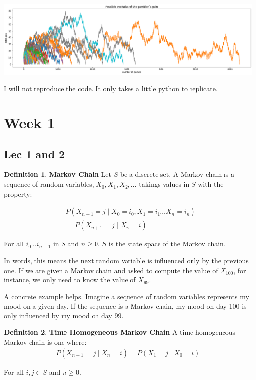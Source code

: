 \documentclass[12pt]{article}
\theoremstyle{definition}
\newtheorem{definition}{Definition}[section]
\begin{document}
\begin{center}
\includegraphics[scale = .35]{index.png}
\end{center}

I will not reproduce the code. It only takes a little python to replicate.


\section{Week 1}
\subsection{Lec 1 and 2}


\begin{definition}{\textbf{Markov Chain}}
Let $S$ be a discrete set. A Markov chain is a sequence of random variables, $X_0, X_1, X_2, \dots$ takings values in $S$ with the property:

\begin{align*}
  &P(X_{n+1} = j \mid X_0 = i_0, X_1 = i_1 \dots X_{n} = i_n) \\
  &= P(X_{n+1} = j \mid X_n = i)
\end{align*}

For all $i_0 \dots i_{n-1}$ in $S$ and $n \geq 0$. $S$ is the state space of the Markov chain.

\end{definition}

In words, this means the next random variable is influenced only by the previous one. If we are given a Markov chain and asked to compute the value of $X_{100}$, for instance, we only need to know the value of $X_{99}$.

A concrete example helps. Imagine a sequence of random variables represents my mood on a given day. If the sequence is a Markov chain, my mood on day 100 is only influenced by my mood on day 99.



\begin{definition}{\textbf{Time Homogeneous Markov Chain}}
A time homogeneous Markov chain is one where:
\begin{align*}
  P(X_{n+1} = j \mid X_n = i) = P(X_1 = j \mid X_0 = i)
\end{align*}

For all $i,j \in S$ and $n\geq 0$.
\end{definition}
\end{document}
